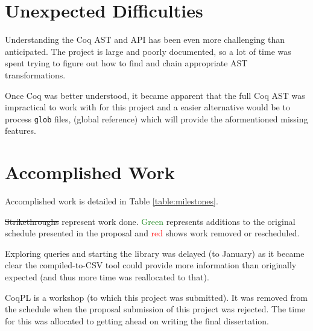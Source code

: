 \documentclass[12pt]{article}
\begin{document}
\section*{Unexpected Difficulties}

Understanding the Coq AST and API has been even more challenging than
anticipated.  The project is large and poorly documented, so a lot of time was
spent trying to figure out how to find and chain appropriate AST
transformations.

Once Coq was better understood, it became apparent that the full Coq AST was
impractical to work with for this project and a easier alternative would be to
process \texttt{glob} files, (global reference) which will provide the
aformentioned missing features.

\section*{Accomplished Work}

Accomplished work is detailed in Table \ref{table:milestones}.

\sout{Strikethroughs} represent work done. \textcolor{ForestGreen}{Green}
represents additions to the original schedule presented in the proposal and
\textcolor{red}{red} shows work removed or rescheduled.

Exploring queries and starting the library was delayed (to January) as it
became clear the compiled-to-CSV tool could provide more information than
originally expected (and thus more time was reallocated to that).

CoqPL is a workshop (to which this project was submitted). It was removed from
the schedule when the proposal submission of this project was rejected.  The
time for this was allocated to getting ahead on writing the final dissertation.
\end{document}
